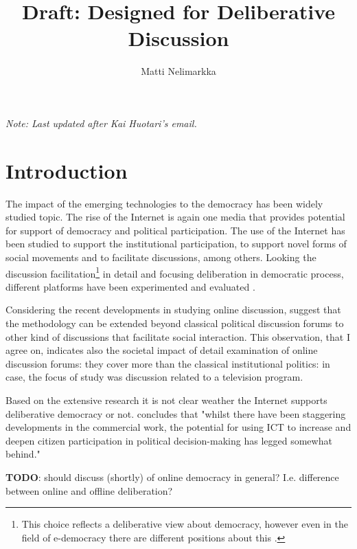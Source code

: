 \documentclass[journal,a4paper]{IEEEtran}
\author{Matti Nelimarkka}
\title{Draft: Designed for Deliberative Discussion}
\begin{document}
\maketitle

\setlength{\parindent}{0pt}
\setlength{\parskip}{1ex}

\textit{Note: Last updated after Kai Huotari's email.}

\section{Introduction}

The impact of the emerging technologies to the democracy has been widely studied topic. The rise of the Internet is again one media that provides potential for support of democracy and political participation. The use of the Internet has been studied to support the institutional participation, to support novel forms of social movements and to facilitate discussions, among others. Looking the discussion facilitation\footnote{This choice reflects a deliberative view about democracy, however even in the field of e-democracy there are different positions about this .} in detail and focusing deliberation in democratic process, different platforms have been experimented  and evaluated .

Considering the recent developments in studying online discussion,  suggest that the methodology can be extended beyond classical political discussion forums to other kind of discussions that facilitate social interaction. This observation, that I agree on, indicates also the societal impact of detail examination of online discussion forums: they cover more than the classical institutional politics: in  case, the focus of study was discussion related to a television program.

Based on the extensive research it is not clear weather the Internet supports deliberative democracy or not.  concludes that "whilst there have been staggering developments in the commercial work, the potential for using ICT to increase and deepen citizen participation in political decision-making has legged somewhat behind."

\textbf{TODO}: should discuss (shortly) of online democracy in general? I.e. difference between online and offline deliberation?
\end{document}

